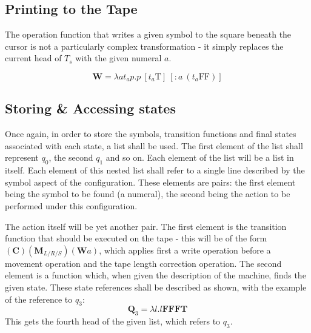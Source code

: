 \documentclass[Master.tex]{subfiles}
\begin{document}
\subsection{Printing to the Tape}

The operation function that writes a given symbol to the square beneath the cursor is not a particularly complex transformation - it simply replaces the current head of $T_s$ with the given numeral $a$.

\begin{equation*}
\bm{W} = \lambda a t_a p.p\ [t_a\bm{\mathrm{T}}]\ [\mathrm{\bm{:}} a\  (t_a \bm{\mathrm{FF}})]
\end{equation*}

\subsection{Storing \& Accessing states}
Once again, in order to store the symbols, transition functions and final states associated with each state,  a list shall be used. The first element of the list shall represent $q_0$, the second $q_1$ and so on.
Each element of the list will be a list in itself. Each element of this nested list shall refer to a single line described by the symbol aspect of the configuration. These elements are pairs: the first element being the symbol to be found (a numeral), the second being the action to be performed under this configuration.

The action itself will be yet another pair. The first element is the transition function that should be executed on the tape - this will be of the form $(\bm{C})(\bm{M}_{L/R/S})(\bm{W}a)$, which applies first a write operation before a movement operation and the tape length correction operation. The second element is a function which, when given the description of the machine, finds the given state. These state references shall be described as shown, with the example of the reference to $q_3$:
\begin{equation*}
\bm{Q}_3 = \lambda l.l\bm{\textbf{FFFT}}
\end{equation*}
This gets the fourth head of the given list, which refers to $q_3$.
\end{document}
